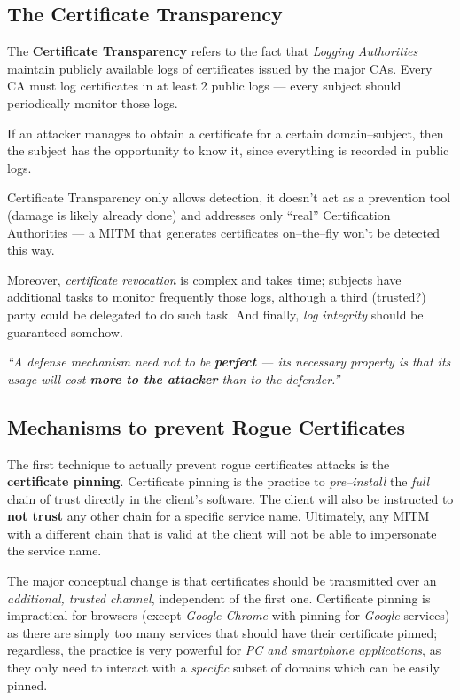 \documentclass[10pt]{extreport}
\begin{document}
\subsection{The Certificate Transparency}

The \textbf{Certificate Transparency} refers to the fact that \emph{Logging
Authorities} maintain publicly available logs of certificates issued by the major CAs.
Every CA must log certificates in at least 2 public logs --- every subject
should periodically monitor those logs.

If an attacker manages to obtain a certificate for a certain domain\---subject,
then the subject has the opportunity to know it, since everything is recorded
in public logs.

Certificate Transparency only allows detection, it doesn't act as a prevention
tool (damage is likely already done) and addresses only ``real'' Certification
Authorities --- a MITM that generates certificates on--the--fly won't be
detected this way.

Moreover, \emph{certificate revocation} is complex and takes time; subjects
have additional tasks to monitor frequently those logs, although a third
(trusted?) party could be delegated to do such task. And finally, \emph{log
integrity} should be guaranteed somehow.

\vspace*{1cm}
\begin{center}
    \emph{``A defense mechanism need not to be \textbf{perfect} --- its necessary
    property is that its usage will cost \textbf{more to the attacker} than to
the defender.''}
\end{center}
\vspace*{1cm}

\subsection{Mechanisms to prevent Rogue Certificates}

The first technique to actually prevent rogue certificates attacks is the
\textbf{certificate pinning}. Certificate pinning is the practice to
\emph{pre--install} the \emph{full} chain of trust directly in the client's
software. The client will also be instructed to \textbf{not trust} any other
chain for a specific service name. Ultimately, any MITM with a different chain
that is valid at the client will not be able to impersonate the service name.

The major conceptual change is that certificates should be transmitted over an
\emph{additional, trusted channel}, independent of the first one. Certificate
pinning is impractical for browsers (except \emph{Google Chrome} with pinning
for \emph{Google} services) as there are simply too many services that should
have their certificate pinned; regardless, the practice is very powerful for
\emph{PC and smartphone applications}, as they only need to interact with a
\emph{specific} subset of domains which can be easily pinned.
\end{document}
